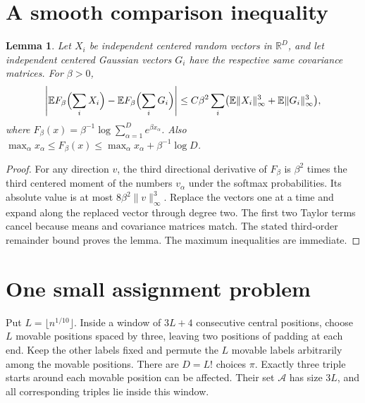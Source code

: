 \documentclass[11pt]{article}
\newtheorem{lemma}[theorem]{Lemma}
\newcommand{\E}{\mathbb E}
\begin{document}
\section{A smooth comparison inequality}
\begin{lemma}\label{lem:comparison}
Let $X_i$ be independent centered random vectors in $\mathbb R^D$, and
let independent centered Gaussian vectors $G_i$ have the respective same
covariance matrices. For $\beta>0$,
\[
 \left|\E F_\beta\Bigl(\sum_iX_i\Bigr)
       -\E F_\beta\Bigl(\sum_iG_i\Bigr)\right|
 \leq C\beta^2\sum_i\bigl(\E\|X_i\|_\infty^3+
                              \E\|G_i\|_\infty^3\bigr),
\]
where $F_\beta(x)=\beta^{-1}\log\sum_{\alpha=1}^D e^{\beta x_\alpha}$.
Also $\max_\alpha x_\alpha\leq F_\beta(x)
\leq\max_\alpha x_\alpha+\beta^{-1}\log D$.
\end{lemma}
\begin{proof}
For any direction $v$, the third directional derivative of $F_\beta$ is
$\beta^2$ times the third centered moment of the numbers $v_\alpha$ under
the softmax probabilities. Its absolute value is at most
$8\beta^2\|v\|_\infty^3$. Replace the vectors one at a time and expand
along the replaced vector through degree two. The first two Taylor terms
cancel because means and covariance matrices match. The stated third-order
remainder bound proves the lemma. The maximum inequalities are immediate.
\end{proof}

\section{One small assignment problem}
Put $L=\lfloor n^{1/10}\rfloor$. Inside a window of $3L+4$ consecutive
central positions, choose $L$ movable positions spaced by three, leaving
two positions of padding at each end. Keep the other labels fixed and
permute the $L$ movable labels arbitrarily among the movable positions.
There are $D=L!$ choices $\pi$. Exactly three triple starts around each
movable position can be affected. Their set $\mathcal A$ has size $3L$,
and all corresponding triples lie inside this window.
\end{document}
